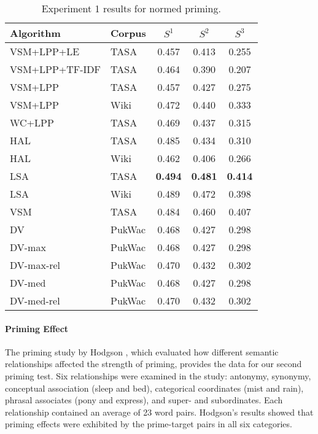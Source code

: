 \documentclass[11pt]{article}
\begin{document}
\begin{table}[bt]
  \small
  \center
  \begin{tabular}{l l  ccc }
  \toprule
  Algorithm & Corpus & $S^1$ & $S^2$ & $S^3$  \\
  \midrule
  VSM+LPP+LE    & TASA &  0.457  &  0.413  &  0.255  \\
  VSM+LPP+TF-IDF & TASA &  0.464  &  0.390  &  0.207   \\
  VSM+LPP       & TASA &  0.457  &  0.427  &  0.275  \\
  VSM+LPP       & Wiki &  0.472  &  0.440  &  0.333  \\
  WC+LPP        & TASA &  0.469  &  0.437  &  0.315  \\

  HAL & TASA & 0.485 & 0.434 & 0.310  \\
  HAL & Wiki & 0.462 & 0.406 & 0.266  \\
  LSA & TASA & {\bf 0.494} & {\bf 0.481} & {\bf 0.414}  \\
  LSA & Wiki & 0.489  &  0.472  &  0.398  \\
  VSM & TASA & 0.484  &  0.460  &  0.407  \\

  DV & PukWac &  0.468  &  0.427  &  0.298  \\
  DV-max & PukWac &  0.468  &  0.427  &  0.298  \\
  DV-max-rel & PukWac &  0.470  &  0.432  &  0.302  \\
  DV-med & PukWac &  0.468  &  0.427  &  0.298  \\
  DV-med-rel & PukWac &  0.470  &  0.432  &  0.302  \\

  \bottomrule
  \end{tabular}
  \caption{Experiment 1 results for normed priming.}
  \label{tab:semantic-priming}
\end{table}


\paragraph{Priming Effect} 
The priming study by Hodgson , which evaluated
how different semantic relationships affected the strength of priming, provides
the data for our second priming test.  Six relationships were examined in the
study: antonymy, synonymy, conceptual association (sleep and bed), categorical
coordinates (mist and rain), phrasal associates (pony and express), and super-
and subordinates.  Each relationship contained an average of 23 word pairs.
Hodgson's results showed that priming effects were exhibited by the prime-target
pairs in all six categories.
\end{document}
